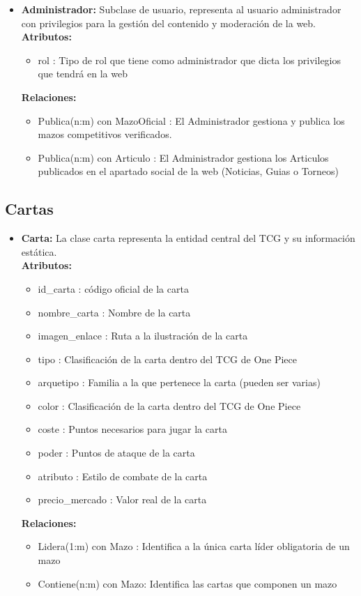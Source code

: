 \documentclass[10pt]{article}
\begin{document}
\begin{itemize}
			\item \textbf{Administrador:} Subclase de usuario, representa al usuario administrador con privilegios para la gestión del contenido y moderación de la web.\\
			\textbf{Atributos:}
			\begin{itemize}
				\item rol : Tipo de rol que tiene como administrador que dicta los privilegios que tendrá en la web
			\end{itemize}
			\textbf{Relaciones:}
			\begin{itemize}
				\item Publica(n:m) con MazoOficial : El Administrador gestiona y publica los mazos competitivos verificados.
				\item Publica(n:m) con Articulo : El Administrador gestiona los Articulos publicados en el apartado social de la web (Noticias, Guias o Torneos)
			\end{itemize}
		\end{itemize}
		
	\subsection{Cartas}
	\begin{itemize}
		\item \textbf{Carta:} La clase carta representa la entidad central del TCG y su información estática.\\
		\textbf{Atributos:}
		\begin{itemize}
			\item id\_carta : código oficial de la carta
			\item nombre\_carta : Nombre de la carta
			\item imagen\_enlace : Ruta a la ilustración de la carta
			\item tipo : Clasificación de la carta dentro del TCG de One Piece
			\item arquetipo : Familia a la que pertenece la carta (pueden ser varias)
			\item color : Clasificación de la carta dentro del TCG de One Piece
			\item coste : Puntos necesarios para jugar la carta
			\item poder : Puntos de ataque de la carta
			\item atributo : Estilo de combate de la carta
			\item precio\_mercado : Valor real de la carta
		\end{itemize}
		\textbf{Relaciones:}
		\begin{itemize}
			\item Lidera(1:m) con Mazo : Identifica a la única carta líder obligatoria de un mazo
			\item Contiene(n:m) con Mazo: Identifica las cartas que componen un mazo
		\end{itemize}
	\end{itemize}
	
\end{document}
